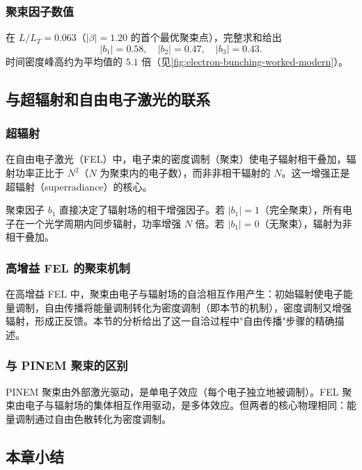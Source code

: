 \subsubsection{聚束因子数值}

在 $L/L_T=0.063$（$|\beta|=1.20$ 的首个最优聚束点），完整求和给出
\begin{equation}
|b_1|=0.58,\quad |b_2|=0.47,\quad |b_3|=0.43.
\label{eq:feqo-bunching-numerical}
\end{equation}
时间密度峰高约为平均值的 $5.1$ 倍（见\cref{fig:electron-bunching-worked-modern}）。

\subsection{与超辐射和自由电子激光的联系}

\subsubsection{超辐射}

在自由电子激光（FEL）中，电子束的密度调制（聚束）使电子辐射相干叠加，辐射功率正比于 $N^2$（$N$ 为聚束内的电子数），而非非相干辐射的 $N$。这一增强正是超辐射（superradiance）的核心。

聚束因子 $b_1$ 直接决定了辐射场的相干增强因子。若 $|b_1|=1$（完全聚束），所有电子在一个光学周期内同步辐射，功率增强 $N$ 倍。若 $|b_1|=0$（无聚束），辐射为非相干叠加。

\subsubsection{高增益 FEL 的聚束机制}

在高增益 FEL 中，聚束由电子与辐射场的自洽相互作用产生：初始辐射使电子能量调制，自由传播将能量调制转化为密度调制（即本节的机制），密度调制又增强辐射，形成正反馈。本节的分析给出了这一自洽过程中"自由传播"步骤的精确描述。

\subsubsection{与 PINEM 聚束的区别}

PINEM 聚束由外部激光驱动，是单电子效应（每个电子独立地被调制）。FEL 聚束由电子与辐射场的集体相互作用驱动，是多体效应。但两者的核心物理相同：能量调制通过自由色散转化为密度调制。

\subsection{本章小结}

